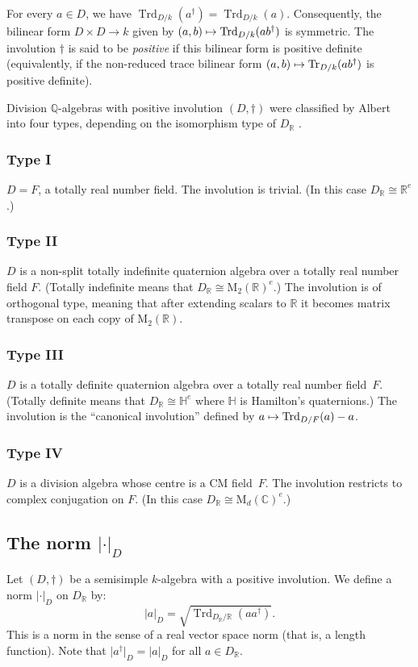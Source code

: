 \documentclass[11pt]{article}
\numberwithin{equation}{section}
\def\mto{\mathchoice{\longmapsto}{\mapsto}{\mapsto}{\mapsto}}
\newcommand{\bC}{\mathbb{C}}
\newcommand{\bH}{\mathbb{H}}
\newcommand{\bQ}{\mathbb{Q}}
\newcommand{\bR}{\mathbb{R}}
\newcommand{\rM}{\mathrm{M}}
\DeclareMathOperator{\Tr}{Tr}
\DeclareMathOperator{\Trd}{Trd}
\newcommand{\abs}[1]{\lvert #1 \rvert}
\newcommand{\defterm}[1]{\emph{#1}}
\begin{document}
For every $a \in D$, we have $\Trd_{D/k}(a^\dag) = \Trd_{D/k}(a)$.
Consequently, the bilinear form $D \times D \to k$ given by $(a,b) \mto \Trd_{D/k}(ab^\dag)$ is symmetric. The involution $\dag$ is said to be \defterm{positive} if this bilinear form is positive definite (equivalently, if the non-reduced trace bilinear form $(a,b) \mto \Tr_{D/k}(ab^\dag)$ is positive definite).

Division $\bQ$-algebras with positive involution $(D,\dag)$ were classified by Albert into four types, depending on the isomorphism type of $D_\bR$ \cite[\S21, Th.\,2]{Mum74}.

\subsubsection*{Type I} $D = F$, a totally real number field. The involution is trivial. (In this case $D_\bR \cong \bR^e$.)
\subsubsection*{Type II} $D$ is a non-split totally indefinite quaternion algebra over a totally real number field $F$. (Totally indefinite means that $D_\bR \cong \rM_2(\bR)^e$.)
The involution is of orthogonal type, meaning that after extending scalars to $\bR$ it becomes matrix transpose on each copy of $\rM_2(\bR)$.
\subsubsection*{Type III} $D$ is a totally definite quaternion algebra over a totally real number field~$F$. (Totally definite means that $D_\bR \cong \bH^e$ where $\bH$ is Hamilton's quaternions.)
The involution is the ``canonical involution'' defined by $a \mto \Trd_{D/F}(a) - a$.
\subsubsection*{Type IV} $D$ is a division algebra whose centre is a CM field~$F$.
The involution restricts to complex conjugation on $F$. (In this case $D_\bR \cong \rM_d(\bC)^e$.)

\subsection{The norm \texorpdfstring{$\abs{\cdot}_D$}{||D}} \label{subsec:norm-D}

Let $(D,\dag)$ be a semisimple $k$-algebra with a positive involution.
We define a norm $\abs{\cdot}_D$ on $D_\bR$ by:
\[
\abs{a}_D = \sqrt{\Trd_{D_\bR/\bR}(aa^\dag)}.
\]
This is a norm in the sense of a real vector space norm (that is, a length function).
Note that $\abs{a^\dag}_D = \abs{a}_D$ for all $a \in D_\bR$.
\end{document}
